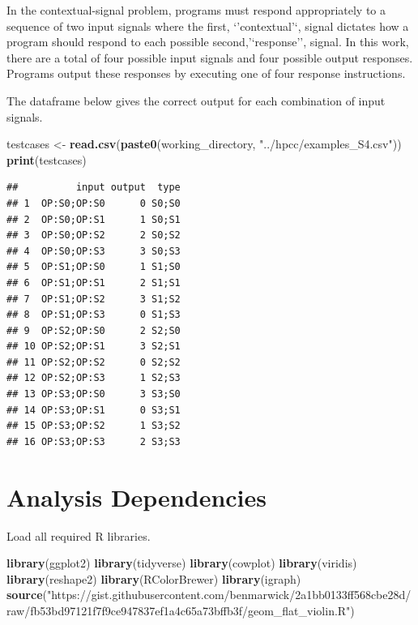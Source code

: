\documentclass[]{book}
\newenvironment{Shaded}{\begin{snugshade}}{\end{snugshade}}
\newcommand{\KeywordTok}[1]{\textcolor[rgb]{0.13,0.29,0.53}{\textbf{#1}}}
\newcommand{\NormalTok}[1]{#1}
\newcommand{\StringTok}[1]{\textcolor[rgb]{0.31,0.60,0.02}{#1}}
\begin{document}
In the contextual-signal problem, programs must respond appropriately to a sequence of two input signals where the first, `'contextual'`, signal dictates how a program should respond to each possible second,'`response'', signal.
In this work, there are a total of four possible input signals and four possible output responses.
Programs output these responses by executing one of four response instructions.

The dataframe below gives the correct output for each combination of input signals.

\begin{Shaded}
\begin{Highlighting}[]
\NormalTok{testcases <-}\StringTok{ }\KeywordTok{read.csv}\NormalTok{(}\KeywordTok{paste0}\NormalTok{(working_directory, }\StringTok{"../hpcc/examples_S4.csv"}\NormalTok{))}
\KeywordTok{print}\NormalTok{(testcases)}
\end{Highlighting}
\end{Shaded}

\begin{verbatim}
##          input output  type
## 1  OP:S0;OP:S0      0 S0;S0
## 2  OP:S0;OP:S1      1 S0;S1
## 3  OP:S0;OP:S2      2 S0;S2
## 4  OP:S0;OP:S3      3 S0;S3
## 5  OP:S1;OP:S0      1 S1;S0
## 6  OP:S1;OP:S1      2 S1;S1
## 7  OP:S1;OP:S2      3 S1;S2
## 8  OP:S1;OP:S3      0 S1;S3
## 9  OP:S2;OP:S0      2 S2;S0
## 10 OP:S2;OP:S1      3 S2;S1
## 11 OP:S2;OP:S2      0 S2;S2
## 12 OP:S2;OP:S3      1 S2;S3
## 13 OP:S3;OP:S0      3 S3;S0
## 14 OP:S3;OP:S1      0 S3;S1
## 15 OP:S3;OP:S2      1 S3;S2
## 16 OP:S3;OP:S3      2 S3;S3
\end{verbatim}

\hypertarget{analysis-dependencies-2}{%
\section{Analysis Dependencies}\label{analysis-dependencies-2}}

Load all required R libraries.

\begin{Shaded}
\begin{Highlighting}[]
\KeywordTok{library}\NormalTok{(ggplot2)}
\KeywordTok{library}\NormalTok{(tidyverse)}
\KeywordTok{library}\NormalTok{(cowplot)}
\KeywordTok{library}\NormalTok{(viridis)}
\KeywordTok{library}\NormalTok{(reshape2)}
\KeywordTok{library}\NormalTok{(RColorBrewer)}
\KeywordTok{library}\NormalTok{(igraph)}
\KeywordTok{source}\NormalTok{(}\StringTok{"https://gist.githubusercontent.com/benmarwick/2a1bb0133ff568cbe28d/raw/fb53bd97121f7f9ce947837ef1a4c65a73bffb3f/geom_flat_violin.R"}\NormalTok{)}
\end{Highlighting}
\end{Shaded}
\end{document}
